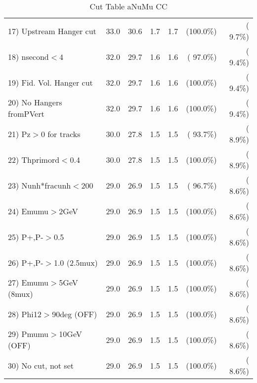 \begin{table}[h!]
\begin{tabular}{||l||r|r|r|r|r|r||}
 17) Upstream Hanger cut  &         33.0 &         30.6 &          1.7 &          1.7 & (100.0\%) & (  9.7\%) \\
 18) nsecond$<$4          &         32.0 &         29.7 &          1.6 &          1.6 & ( 97.0\%) & (  9.4\%) \\
 19) Fid. Vol. Hanger cut &         32.0 &         29.7 &          1.6 &          1.6 & (100.0\%) & (  9.4\%) \\
 20) No Hangers fromPVert &         32.0 &         29.7 &          1.6 &          1.6 & (100.0\%) & (  9.4\%) \\
 21) Pz$>$0 for tracks    &         30.0 &         27.8 &          1.5 &          1.5 & ( 93.7\%) & (  8.9\%) \\
 22) Thprimord$<$0.4      &         30.0 &         27.8 &          1.5 &          1.5 & (100.0\%) & (  8.9\%) \\
 23) Nunh*fracunh$<$200   &         29.0 &         26.9 &          1.5 &          1.5 & ( 96.7\%) & (  8.6\%) \\
 24) Emumu$>$2GeV         &         29.0 &         26.9 &          1.5 &          1.5 & (100.0\%) & (  8.6\%) \\
 25) P+,P-$>$0.5          &         29.0 &         26.9 &          1.5 &          1.5 & (100.0\%) & (  8.6\%) \\
 26) P+,P-$>$1.0 (2.5mux) &         29.0 &         26.9 &          1.5 &          1.5 & (100.0\%) & (  8.6\%) \\
 27) Emumu$>$5GeV  (8mux) &         29.0 &         26.9 &          1.5 &          1.5 & (100.0\%) & (  8.6\%) \\
 28) Phi12$>$90deg  (OFF) &         29.0 &         26.9 &          1.5 &          1.5 & (100.0\%) & (  8.6\%) \\
 29) Pmumu$>$10GeV  (OFF) &         29.0 &         26.9 &          1.5 &          1.5 & (100.0\%) & (  8.6\%) \\
 30) No cut, not set      &         29.0 &         26.9 &          1.5 &          1.5 & (100.0\%) & (  8.6\%) \\
 \hline
 \hline
 \end{tabular}
 \caption{Cut Table  aNuMu CC }
 \label{tab-cutcohjpsi-mumu_res}
 \end{table}

